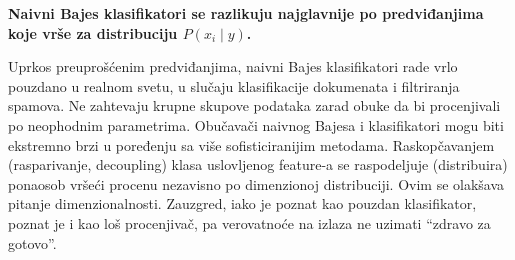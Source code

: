 \documentclass[fontsize=12bp, paper=a4]{scrarticle}
\begin{document}
\vbox{}
\textbf{Naivni Bajes klasifikatori se razlikuju najglavnije po predviđanjima koje vrše za distribuciju $P(x_i \mid y)$.}

Uprkos preuprošćenim predviđanjima, naivni Bajes klasifikatori rade vrlo pouzdano u realnom svetu, u slučaju klasifikacije dokumenata i filtriranja spamova. Ne zahtevaju krupne skupove podataka zarad obuke da bi procenjivali po neophodnim parametrima. Obučavači naivnog Bajesa i klasifikatori mogu biti ekstremno brzi u poređenju sa više sofisticiranijim metodama. Raskopčavanjem (rasparivanje, decoupling) klasa uslovljenog feature-a se raspodeljuje (distribuira) ponaosob vršeći procenu nezavisno po dimenzionoj distribuciji. Ovim se olakšava pitanje dimenzionalnosti. Zauzgred, iako je poznat kao pouzdan klasifikator, poznat je i kao loš procenjivač, pa verovatnoće na izlaza ne uzimati ``zdravo za gotovo''.
\end{document}
